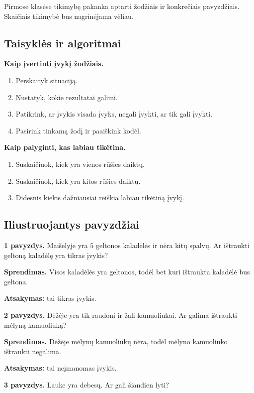 \begin{pastaba}
Pirmose klasėse tikimybę pakanka aptarti žodžiais ir konkrečiais pavyzdžiais. Skaičiais tikimybė bus nagrinėjama vėliau.
\end{pastaba}

\subsection{Taisyklės ir algoritmai}

\textbf{Kaip įvertinti įvykį žodžiais.}
\begin{enumerate}
\item Perskaityk situaciją.
\item Nustatyk, kokie rezultatai galimi.
\item Patikrink, ar įvykis visada įvyks, negali įvykti, ar tik gali įvykti.
\item Pasirink tinkamą žodį ir paaiškink kodėl.
\end{enumerate}

\textbf{Kaip palyginti, kas labiau tikėtina.}
\begin{enumerate}
\item Suskaičiuok, kiek yra vienos rūšies daiktų.
\item Suskaičiuok, kiek yra kitos rūšies daiktų.
\item Didesnis kiekis dažniausiai reiškia labiau tikėtiną įvykį.
\end{enumerate}

\subsection{Iliustruojantys pavyzdžiai}

\textbf{1 pavyzdys.} Maišelyje yra \(5\) geltonos kaladėlės ir nėra kitų spalvų. Ar ištraukti geltoną kaladėlę yra tikras įvykis?

\textbf{Sprendimas.} Visos kaladėlės yra geltonos, todėl bet kuri ištraukta kaladėlė bus geltona.

\textbf{Atsakymas:} tai tikras įvykis.

\textbf{2 pavyzdys.} Dėžėje yra tik raudoni ir žali kamuoliukai. Ar galima ištraukti mėlyną kamuoliuką?

\textbf{Sprendimas.} Dėžėje mėlynų kamuoliukų nėra, todėl mėlyno kamuoliuko ištraukti negalima.

\textbf{Atsakymas:} tai neįmanomas įvykis.

\textbf{3 pavyzdys.} Lauke yra debesų. Ar gali šiandien lyti?

